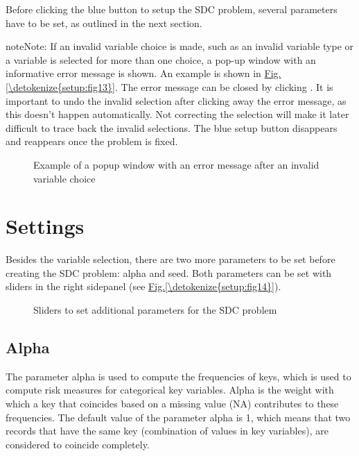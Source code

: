 \documentclass[letterpaper,10pt,english]{sphinxmanual}
\begin{document}
Before clicking the blue button to setup the SDC problem, several parameters have to be set,
as outlined in the next section.

\begin{sphinxadmonition}{note}{Note:}
If an invalid variable choice is made, such as an invalid variable type
or a variable is selected for more than one choice, a pop-up window with an informative
error message is shown. An example is shown in \hyperref[\detokenize{setup:fig13}]{Fig.\@ \ref{\detokenize{setup:fig13}}}. The error
message can be closed by clicking .
It is important to undo the invalid selection after clicking away
the error message, as this doesn’t happen automatically.
Not correcting the selection will
make it later difficult to trace back the invalid selections.
The blue setup button disappears and reappears once the problem is fixed.
\end{sphinxadmonition}

\begin{figure}[htbp]
\centering
\capstart

\noindent{}
\caption{Example of a popup window with an error message after an invalid variable choice}\label{\detokenize{setup:fig13}}\label{\detokenize{setup:id4}}\end{figure}


\section{Settings}
\label{\detokenize{setup:settings}}
Besides the variable selection, there are two more parameters to be set before creating
the SDC problem: alpha and seed. Both parameters can be set with sliders
in the right sidepanel (see \hyperref[\detokenize{setup:fig14}]{Fig.\@ \ref{\detokenize{setup:fig14}}}).

\begin{figure}[htbp]
\centering
\capstart

\noindent{}
\caption{Sliders to set additional parameters for the SDC problem}\label{\detokenize{setup:fig14}}\label{\detokenize{setup:id5}}\end{figure}


\subsection{Alpha}
\label{\detokenize{setup:alpha}}
The parameter alpha is used to compute the frequencies of keys, which is used to compute risk
measures for categorical key variables. Alpha is the weight with which a key that coincides
based on a missing value (NA) contributes to these frequencies. The default value of the
parameter alpha is 1, which means that two records that have the same key (combination
of values in key variables), are considered to coincide completely.
\end{document}
